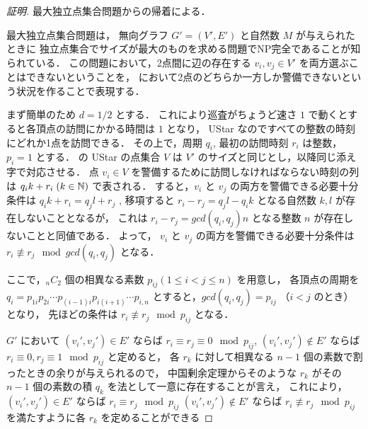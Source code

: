 \begin{proof}[証明]
	最大独立点集合問題からの帰着による．

	最大独立点集合問題は，
	無向グラフ $G' = (V', E')$ と自然数 $M$ が与えられたときに
	独立点集合でサイズが最大のものを求める問題でNP完全であることが知られている．
	この問題において，2点間に辺の存在する $v_i, v_j \in V'$ を両方選ぶことはできないということを，
	\optpp において2点のどちらか一方しか警備できないという状況を作ることで表現する．

	まず簡単のため $d = 1/2$ とする．
	これにより巡査がちょうど速さ $1$ で動くとすると各頂点の訪問にかかる時間は $1$ となり，
	UStar なのですべての整数の時刻にどれか1点を訪問できる．
	その上で，周期 $q_i$, 最初の訪問時刻 $r_i$ は整数，$p_i = 1$ とする．
	\optpp の UStar の点集合 $V$ は $V'$ のサイズと同じとし，以降同じ添え字で対応させる．
	点 $v_i \in V$ を警備するために訪問しなければならない時刻の列は
	$q_i k + r_i \; (k \in \mathbb{N})$ で表される．
	すると，$v_i$ と $v_j$ の両方を警備できる必要十分条件は
	$q_i k + r_i = q_j l + r_j$ , 移項すると
	$r_i - r_j = q_j l - q_i k$ 
	となる自然数 $k, l$ が存在しないこととなるが，
	これは $r_i - r_j = gcd(q_i,q_j) n$ となる整数 $n$ が存在しないことと同値である．
	よって，
	$v_i$ と $v_j$ の両方を警備できる必要十分条件は
	$r_i \not\equiv r_j \mod gcd(q_i, q_j)$
	となる．

	ここで，${}_n C_2$ 個の相異なる素数 $p_{ij} (1\leq i < j \leq n)$ を用意し，
	各頂点の周期を
	$q_i = p_{1i} p_{2i} \cdots p_{(i - 1)i} p_{i(i + 1)} \cdots p_{i,n}$
	とすると，$gcd(q_i,q_j) = p_{ij}$ （$i < j$ のとき）となり，
	先ほどの条件は
	$r_i \not\equiv r_j \mod p_{ij}$
	となる．

	$G'$ において
	$(v_i', v_j') \in E'$     ならば $r_i \equiv r_j \equiv 0 \mod p_{ij}$,
	$(v_i', v_j') \not\in E'$ ならば $r_i \equiv 0, r_j \equiv 1 \mod p_{ij}$
	と定めると，
	各 $r_k$ に対して相異なる $n - 1$ 個の素数で割ったときの余りが与えられるので，
	中国剰余定理からそのような $r_k$ がその $n - 1$ 個の素数の積 $q_k$ を法として一意に存在することが言え，
	これにより，$(v_i', v_j') \in E'$ ならば $r_i \equiv r_j \mod p_{ij}$
	$(v_i', v_j') \not\in E'$ ならば $r_i \not\equiv r_j \mod p_{ij}$
	を満たすように各 $r_k$ を定めることができる


\end{proof}
